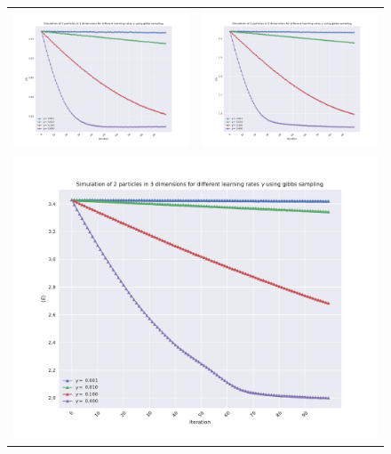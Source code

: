 \begin{figure}
\hspace{-2.8cm}
\begin{tabular}{cc}
\includegraphics[width = 0.5\paperwidth]{figures/gibbs_2p_1d_N3.pdf} & \includegraphics[width = 0.5\paperwidth]{figures/gibbs_2p_2d_N4.pdf} \\
\multicolumn{2}{c}{\includegraphics[width=0.5\paperwidth]{figures/gibbs_2p_3d_N8.pdf} }

\end{tabular}
\end{figure}
